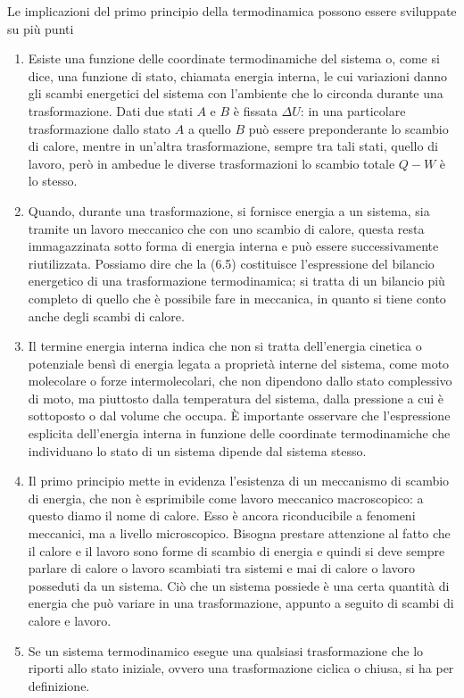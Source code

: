\documentclass[class=book, crop=false, oneside, 12pt]{standalone}
\begin{document}
Le implicazioni del primo principio della termodinamica possono essere sviluppate su più punti
\begin{enumerate}
    \item Esiste una funzione delle coordinate termodinamiche del sistema o, come si dice, una funzione di stato, chiamata energia interna, le cui variazioni danno gli scambi energetici del sistema con l'ambiente che lo circonda durante una trasformazione. 
    Dati due stati \(A\) e \(B\) è fissata \(\Delta U\): in una particolare trasformazione dallo stato \(A\) a quello \(B\) può essere preponderante lo scambio di calore, mentre in un'altra trasformazione, sempre tra tali stati, quello di lavoro, però in ambedue le diverse trasformazioni lo scambio totale \(Q - W\) è lo stesso. 
    \item Quando, durante una trasformazione, si fornisce energia a un sistema, sia tramite un lavoro meccanico che con uno scambio di calore, questa resta immagazzinata sotto forma di energia interna e può essere successivamente riutilizzata.
    Possiamo dire che la (6.5) costituisce l'espressione del bilancio energetico di una trasformazione termodinamica; si tratta di un bilancio più completo di quello che è possibile fare in meccanica, in quanto si tiene conto anche degli scambi di calore.
    \item Il termine energia interna indica che non si tratta dell'energia cinetica o potenziale bensì di energia legata a proprietà interne del sistema, come moto molecolare o forze intermolecolari, che non dipendono dallo stato complessivo di moto, ma piuttosto dalla temperatura del sistema, dalla pressione a cui è sottoposto o dal volume che occupa. 
    È importante osservare che l'espressione esplicita dell'energia interna in funzione delle coordinate termodinamiche che individuano lo stato di un sistema dipende dal sistema stesso.
    \item Il primo principio mette in evidenza l'esistenza di un meccanismo di scambio di energia, che non è esprimibile come lavoro meccanico macroscopico: a questo diamo il nome di calore. 
    Esso è ancora riconducibile a fenomeni meccanici, ma a livello microscopico.
    Bisogna prestare attenzione al fatto che il calore e il lavoro sono forme di scambio di energia e quindi si deve sempre parlare di calore o lavoro scambiati tra sistemi e mai di calore o lavoro posseduti da un sistema. 
    Ciò che un sistema possiede è una certa quantità di energia che può variare in una trasformazione, appunto a seguito di scambi di calore e lavoro.
    \item Se un sistema termodinamico esegue una qualsiasi trasformazione che lo riporti allo stato iniziale, ovvero una trasformazione ciclica o chiusa, si ha per definizione.

\end{enumerate}
\end{document}
